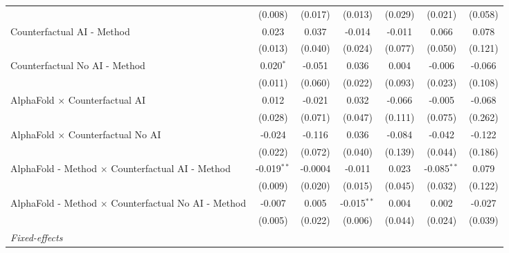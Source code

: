 \begin{tabular}{lcccccc}
                                                              & (0.008)       & (0.017)       & (0.013)       & (0.029)      & (0.021)       & (0.058)\\   
   Counterfactual AI - Method                                 & 0.023         & 0.037         & -0.014        & -0.011       & 0.066         & 0.078\\   
                                                              & (0.013)       & (0.040)       & (0.024)       & (0.077)      & (0.050)       & (0.121)\\   
   Counterfactual No AI - Method                              & 0.020$^{*}$   & -0.051        & 0.036         & 0.004        & -0.006        & -0.066\\   
                                                              & (0.011)       & (0.060)       & (0.022)       & (0.093)      & (0.023)       & (0.108)\\   
   AlphaFold $\times$ Counterfactual AI                       & 0.012         & -0.021        & 0.032         & -0.066       & -0.005        & -0.068\\   
                                                              & (0.028)       & (0.071)       & (0.047)       & (0.111)      & (0.075)       & (0.262)\\   
   AlphaFold $\times$ Counterfactual No AI                    & -0.024        & -0.116        & 0.036         & -0.084       & -0.042        & -0.122\\   
                                                              & (0.022)       & (0.072)       & (0.040)       & (0.139)      & (0.044)       & (0.186)\\   
   AlphaFold - Method $\times$ Counterfactual AI - Method     & -0.019$^{**}$ & -0.0004       & -0.011        & 0.023        & -0.085$^{**}$ & 0.079\\   
                                                              & (0.009)       & (0.020)       & (0.015)       & (0.045)      & (0.032)       & (0.122)\\   
   AlphaFold - Method $\times$ Counterfactual No AI - Method  & -0.007        & 0.005         & -0.015$^{**}$ & 0.004        & 0.002         & -0.027\\   
                                                              & (0.005)       & (0.022)       & (0.006)       & (0.044)      & (0.024)       & (0.039)\\   
   \midrule
   \emph{Fixed-effects}\\

\end{tabular}
